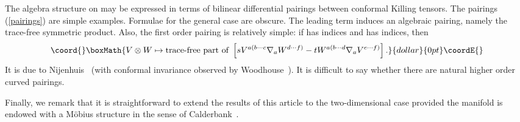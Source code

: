 \documentclass[a4paper,12pt]{amsart}
\begin{document}
The algebra structure on \coordHE{} may be expressed in terms of bilinear
differential pairings between conformal Killing tensors. The pairings
(\ref{pairings}) are simple examples. Formulae for the general case are
obscure. The leading term induces an algebraic pairing,
namely the trace-free symmetric product. Also, the first order pairing is
relatively simple: if \coordHE{} has \coordHE{} indices and \coordHE{} has \coordHE{} indices, then
$$\coord{}\boxMath{V\otimes W\mapsto\mbox{\rm trace-free part of }
\left[sV^{a(b\cdots c}\nabla_aW^{d\cdots f)}
-tW^{a(b\cdots d}\nabla_aV^{e\cdots f)}\right].}{dollar}{0pt}\coordE{}$$
It is due to Nijenhuis~\cite{n} (with conformal invariance observed by
Woodhouse~\cite{wo}). It is difficult to say whether there are natural higher
order curved pairings.

Finally, we remark that it is straightforward to extend the results of this
article to the two-dimensional case provided the manifold is endowed with a
M\"obius structure in the sense of Calderbank~\cite{cal}.
\end{document}
